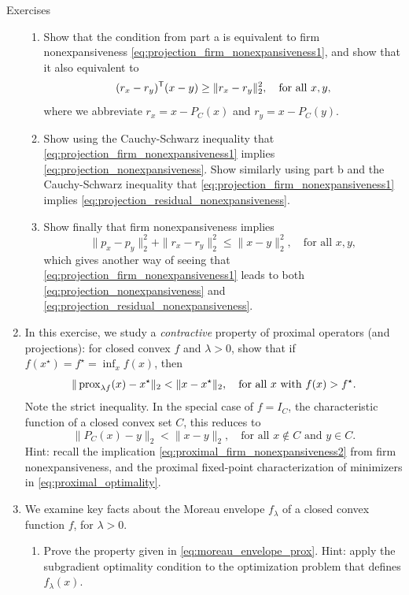 \begin{xcb}{Exercises}
\begin{enumerate}[label=\thechapter.\arabic*]
\begin{enumerate}[label=\alph*.]
\item Show that the condition from part a is equivalent to firm nonexpansiveness 
  \eqref{eq:projection_firm_nonexpansiveness1}, and show that it also equivalent
  to   
  \[
  (r_x - r_y)^{\mathsf{T}} (x - y) \geq \|r_x - r_y\|_2^2, \quad \text{for all $x,y$},
  \]
  where we abbreviate $r_x = x - P_C(x)$ and $r_y = x - P_C(y)$.

\item Show using the Cauchy-Schwarz inequality that
  \eqref{eq:projection_firm_nonexpansiveness1} implies
  \eqref{eq:projection_nonexpansiveness}. Show similarly using part b and the
  Cauchy-Schwarz inequality that \eqref{eq:projection_firm_nonexpansiveness1}
  implies \eqref{eq:projection_residual_nonexpansiveness}.

\item Show finally that firm nonexpansiveness implies 
  \[
  \|p_x - p_y\|_2^2 + \|r_x - r_y\|_2^2 \leq \|x - y\|_2^2, \quad \text{for all
    $x,y$},
  \]
  which gives another way of seeing that
  \eqref{eq:projection_firm_nonexpansiveness1} leads to both
  \eqref{eq:projection_nonexpansiveness} and
  \eqref{eq:projection_residual_nonexpansiveness}. 
\end{enumerate}

\item In this exercise, we study a \emph{contractive} property of proximal
  operators (and projections): for closed convex $f$ and $\lambda > 0$, show
  that if $f(x^\star) = f^\star = \inf_x f(x)$, then   
  \[
  \| \operatorname{prox}_{\lambda f}(x) - x^\star\|_2 < \|x - x^\star\|_2, \quad \text{for
    all $x$ with $f(x) > f^\star$}.
  \]
  Note the strict inequality. In the special case of $f = I_C$, the
  characteristic function of a closed convex set $C$, this reduces to 
  \[
  \| P_C(x) - y\|_2 < \|x - y\|_2, \quad \text{for all $x \notin C$ and $y \in
    C$}.    
  \]
  Hint: recall the implication \eqref{eq:proximal_firm_nonexpansiveness2} from
  firm nonexpansiveness, and the proximal fixed-point characterization of 
  minimizers in \eqref{eq:proximal_optimality}.  

\item \label{ex:moreau_envelope}
  We examine key facts about the Moreau envelope $f_\lambda$ of a closed convex
  function $f$, for $\lambda > 0$. 

\begin{enumerate}[label=\alph*.]
\item Prove the property given in \eqref{eq:moreau_envelope_prox}. Hint: apply
  the subgradient optimality condition to the optimization problem that defines 
  $f_\lambda(x)$.     
 

\end{enumerate}
\end{enumerate}
\end{xcb}
